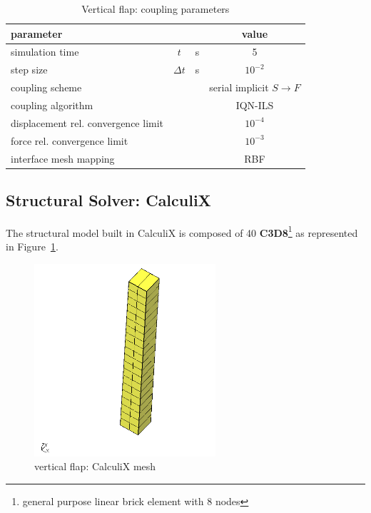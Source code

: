\begin{table}[!htb]
	\begin{center}
		\begin{tabular}{ l c  l| c } 
			parameter & & & value   \\ 
			\hline
			simulation time  & $t$& \si{s} & 5      \\
			step size & $\Delta t$ & \si{s} & $10^{-2}$   \\
			\hline
			coupling scheme & & & serial implicit  $S\rightarrow F$  \\
			coupling algorithm & & &  IQN-ILS  \\
			displacement rel. convergence limit & & & $10^{-4}$ \\
			force rel. convergence limit &&  & $10^{-3}$  \\
      		interface mesh mapping & & & RBF  \\
			
		\end{tabular}
	\end{center}
	\caption{Vertical flap: coupling parameters}
	\label{table:ex1-coupling}
\end{table}





\subsection{Structural Solver: CalculiX}

The structural model built in CalculiX is composed of 40 \textbf{C3D8}\footnote{general purpose linear brick element with 8 nodes} as represented in Figure~\ref{fig:cx-mesh}. 

\begin{figure}[htbp!]
	\centering
	\includegraphics[width=0.6\textwidth]{images/cx1}
	\caption{vertical flap: CalculiX mesh}
	\label{fig:cx-mesh}
\end{figure}

